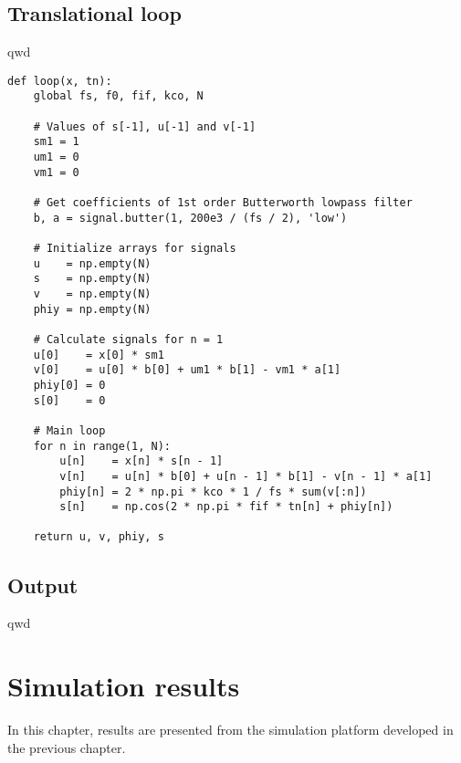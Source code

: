 \section{Translational loop}
qwd

\lstset{language=python,caption=pe,label=code:asdff}
\begin{lstlisting}
def loop(x, tn):
    global fs, f0, fif, kco, N

    # Values of s[-1], u[-1] and v[-1]
    sm1 = 1
    um1 = 0
    vm1 = 0

    # Get coefficients of 1st order Butterworth lowpass filter
    b, a = signal.butter(1, 200e3 / (fs / 2), 'low')

    # Initialize arrays for signals
    u    = np.empty(N)
    s    = np.empty(N)
    v    = np.empty(N)
    phiy = np.empty(N)

    # Calculate signals for n = 1
    u[0]    = x[0] * sm1
    v[0]    = u[0] * b[0] + um1 * b[1] - vm1 * a[1]
    phiy[0] = 0
    s[0]    = 0

    # Main loop
    for n in range(1, N):
        u[n]    = x[n] * s[n - 1]
        v[n]    = u[n] * b[0] + u[n - 1] * b[1] - v[n - 1] * a[1]
        phiy[n] = 2 * np.pi * kco * 1 / fs * sum(v[:n])
        s[n]    = np.cos(2 * np.pi * fif * tn[n] + phiy[n])

    return u, v, phiy, s
\end{lstlisting}


\section{Output}
qwd

\chapter{Simulation results} \label{ch:intro}
In this chapter, results are presented from the simulation platform developed in the previous chapter.















